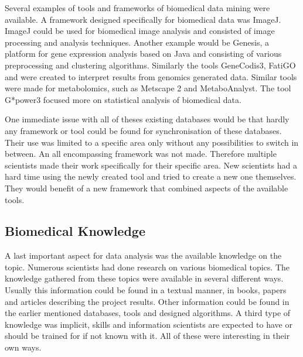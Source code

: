 \documentclass[10pt,a4paper]{article}
\begin{document}
	Several examples of tools and frameworks of biomedical data mining were available. A framework designed specifically for biomedical data was ImageJ\cite{schindelin2015imagej}. ImageJ could be used for biomedical image analysis and consisted of image processing and analysis techniques. Another example would be Genesis\cite{sturn2002genesis}, a platform for gene expression analysis based on Java and consisting of various preprocessing and clustering algorithms. Similarly the tools GeneCodis3\cite{tabas2012genecodis3}, FatiGO\cite{al2004fatigo} and \cite{zeeberg2003gominer} were created to interpret results from genomics generated data. Similar tools were made for metabolomics, such as Metscape 2\cite{karnovsky2011metscape} and MetaboAnalyst\cite{xia2015metaboanalyst}. The tool G*power3\cite{faul2007g} focused more on statistical analysis of biomedical data.
	
	One immediate issue with all of theses existing databases would be that hardly any framework or tool could be found for synchronisation of these databases. Their use was limited to a specific area only without any possibilities to switch in between. An all encompassing framework was not made. Therefore multiple scientists made their work specifically for their specific area. New scientists had a hard time using the newly created tool and tried to create a new one themselves. They would benefit of a new framework that combined aspects of the available tools.\cite{teodoro2009biomedical}
	
	\subsection{Biomedical Knowledge}
	
	A last important aspect for data analysis was the available knowledge on the topic. Numerous scientists had done research on various biomedical topics. The knowledge gathered from these topics were available in several different ways.\cite{bellazzi2011data} Usually this information could be found in a textual manner, in books, papers and articles describing the project results. Other information could be found in the earlier mentioned databases, tools and designed algorithms. A third type of knowledge was implicit, skills and information scientists are expected to have or should be trained for if not known with it.\cite{zupan2006knowledge}  All of these were interesting in their own ways.
	
\end{document}
